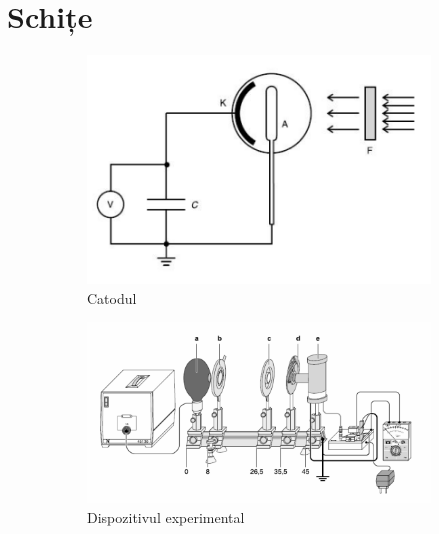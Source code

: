 \documentclass[a4paper]{article}
\begin{document}
\section{Schițe}
\begin{figure}[htbp]
	\centering
	\begin{subfigure}{0.45\textwidth}
		\centering
		\includegraphics[width=\linewidth]{catod.png}
		\caption{Catodul}
		\label{fig:catod}
	\end{subfigure}
	\hfill
	\begin{subfigure}{0.45\textwidth}
		\centering
		\includegraphics[width=\linewidth]{device.png}
		\caption{Dispozitivul experimental}
		\label{fig:device}
	\end{subfigure}
	\caption{}
\end{figure}
\end{document}
